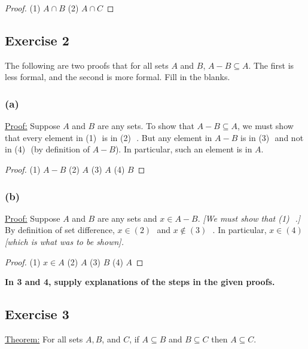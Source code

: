 \documentclass[14pt]{extarticle}
\newcommand{\fbl}{\underline{\hspace{1cm}}\,\,}
\newcommand{\cy}{\color{cyan}}
\begin{document}
\begin{proof}
(1) \(A \cap B\) (2) \(A \cap C\)
\end{proof}

\subsection{Exercise 2}
The following are two proofs that for all sets $A$ and $B$, \(A - B \subseteq A\). The first is less formal, and the 
second is more formal. Fill in the blanks.

\subsubsection{(a)}
\underline{Proof:} Suppose $A$ and $B$ are any sets. To show that \(A - B \subseteq A\), we must show that every 
element in (1) \fbl is in (2) \fbl. But any element in \(A - B\) is in (3) \fbl and not in (4) \fbl (by definition of 
\(A - B\)). In particular, such an element is in $A$.

\begin{proof}
(1) $A - B$ (2) $A$ (3) $A$ (4) $B$
\end{proof}

\subsubsection{(b)}
\underline{Proof:} Suppose $A$ and $B$ are any sets and \(x \in A - B\). {\it [We must show that (1) \fbl.]} By 
definition of set difference, \(x \in (2)\) \fbl and \(x \notin (3)\) \fbl. In particular, \(x \in (4)\) 
{\it [which is what was to be shown].}

\begin{proof}
(1) $x \in A$ (2) $A$ (3) $B$ (4) $A$
\end{proof}

{\bf \cy In 3 and 4, supply explanations of the steps in the given proofs.}

\subsection{Exercise 3}
\underline{Theorem:} For all sets $A, B$, and $C$, if \(A \subseteq B\) and \(B \subseteq C\) then \(A \subseteq C\).
\end{document}
